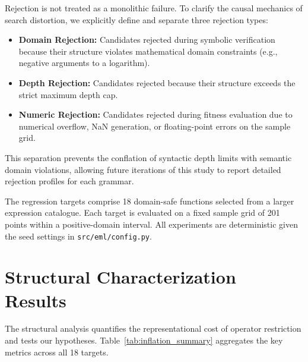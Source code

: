 \documentclass[runningheads]{llncs}
\begin{document}
Rejection is not treated as a monolithic failure. To clarify the causal mechanics of search distortion, we explicitly define and separate three rejection types:
\begin{itemize}[itemsep=0pt,topsep=0pt]
  \item \textbf{Domain Rejection:} Candidates rejected during symbolic verification because their structure violates mathematical domain constraints (e.g., negative arguments to a logarithm).
  \item \textbf{Depth Rejection:} Candidates rejected because their structure exceeds the strict maximum depth cap.
  \item \textbf{Numeric Rejection:} Candidates rejected during fitness evaluation due to numerical overflow, NaN generation, or floating-point errors on the sample grid.
\end{itemize}
This separation prevents the conflation of syntactic depth limits with semantic domain violations, allowing future iterations of this study to report detailed rejection profiles for each grammar.

The regression targets comprise 18 domain-safe functions selected from a
larger expression catalogue. Each target is evaluated on a fixed sample grid
of 201 points within a positive-domain interval. All experiments are
deterministic given the seed settings in \verb!src/eml/config.py!.

\section{Structural Characterization Results}\label{sec:structural_results}

The structural analysis quantifies the representational cost of operator
restriction and tests our hypotheses. Table~\ref{tab:inflation_summary} aggregates the key metrics
across all 18 targets.
\end{document}
